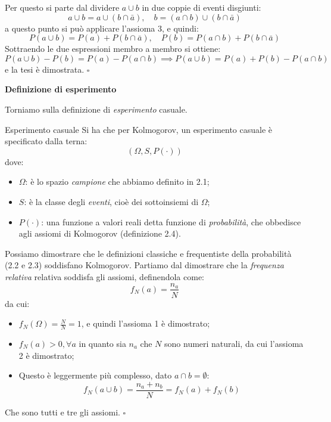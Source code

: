 \documentclass[a4paper,11pt]{article}
\begin{document}
\begin{enumerate}
	Per questo si parte dal dividere $a \cup b$ in due coppie di eventi disgiunti:
	$$
	a \cup b = a \cup (b \cap \bar{a}), \quad b = (a \cap b) \cup (b \cap \bar{a})
	$$
	a questo punto si può applicare l'assioma 3, e quindi:
	$$
	P(a \cup b) = P(a) + P(b \cap \bar{a}), \quad P(b) = P(a \cap b) + P(b \cap \bar{a})
	$$
	Sottraendo le due espressioni membro a membro si ottiene:
	$$
		P(a \cup b) - P(b) = P(a) - P(a \cap b) \implies P(a \cup b) = P(a) + P(b) - P(a \cap b)
	$$
	e la tesi è dimostrata. \hfill $\square$
\end{enumerate}


\par\smallskip

\noindent
\textbf{\textsf{Definizione di esperimento}}

\noindent
Torniamo sulla definizione di \textit{esperimento} casuale. 
\begin{definition}{Esperimento casuale}
	Si ha che per Kolmogorov, un esperimento casuale è specificato dalla terna:
$$
(\Omega, S, P(\cdot))
$$
dove:
\begin{itemize}
	\item $\Omega$: è lo spazio \textit{campione} che abbiamo definito in 2.1;
	\item $S$: è la classe degli \textit{eventi}, cioè dei sottoinsiemi di $\Omega$;
	\item $P(\cdot)$: una funzione a valori reali detta funzione di \textit{probabilità}, che obbedisce agli assiomi di Kolmogorov (definizione 2.4). 
\end{itemize}
\end{definition}

Possiamo dimostrare che le definizioni classiche e frequentiste della probabilità (2.2 e 2.3) soddisfano Kolmogorov. Partiamo dal dimostrare che la \textit{frequenza relativa} relativa soddisfa gli assiomi, definendola come:
$$
f_N(a) = \frac{n_a}{N}
$$
da cui:
\begin{itemize}
	\item $f_N(\Omega) = \frac{N}{N} = 1$, e quindi l'assioma 1 è dimostrato;
	\item $f_N(a) > 0, \forall a$ in quanto sia $n_a$ che $N$ sono numeri naturali, da cui l'assioma 2 è dimostrato;
	\item Questo è leggermente più complesso, dato $a \cap b = \emptyset$:
		$$
		f_N(a \cup b) = \frac{n_a + n_b}{N} = f_N(a) + f_N(b)
		$$
\end{itemize}
Che sono tutti e tre gli assiomi. \hfill $\square$
\end{document}
